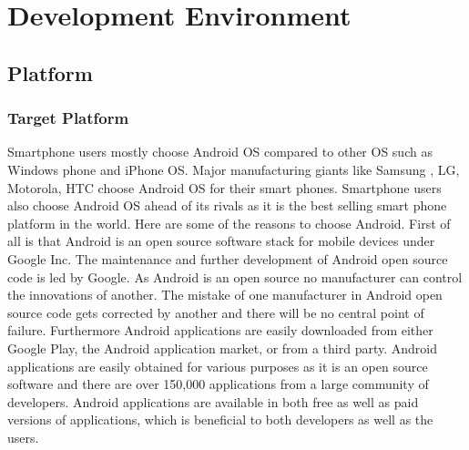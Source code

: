 \section{Development Environment}
\label{sec:dev_environ}


\subsection{Platform}


\subsubsection{Target Platform}
Smartphone users mostly choose Android OS compared to other OS such as Windows phone and iPhone OS. Major manufacturing giants like Samsung , LG, Motorola, HTC choose Android OS for their smart phones. Smartphone users also choose Android OS ahead of its rivals as it is the best selling smart phone platform in the world. Here are some of the reasons to choose Android.
First of all is that Android is an open source software stack for mobile devices under Google Inc. The maintenance and further development of Android open source code is led by Google. As Android is an open source no manufacturer can control the innovations of another. The mistake of one manufacturer in Android open source code gets corrected by another and there will be no central point of failure. Furthermore Android applications are easily downloaded from either Google Play, the Android application market, or from a third party. Android applications are easily obtained for various purposes as it is an open source software and there are over 150,000 applications from a large community of developers. Android applications are available in both free as well as paid versions of applications, which is beneficial to both developers as well as the users.


